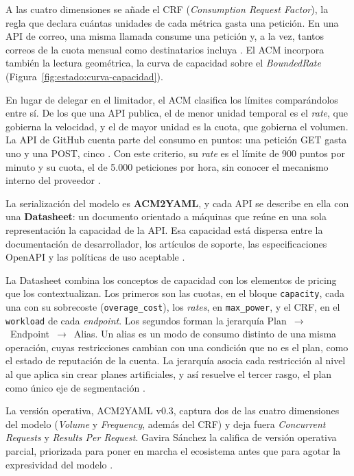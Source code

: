A las cuatro dimensiones se añade el CRF (\textit{Consumption Request Factor}),
la regla que declara cuántas unidades de cada métrica gasta una petición.
En una API de correo, una misma llamada consume una petición y, a la vez, tantos correos de la
cuota mensual como destinatarios incluya \citep{gavira2026tfm}. El ACM
incorpora también la lectura geométrica, la curva de capacidad sobre el
\textit{BoundedRate} (Figura~\ref{fig:estado:curva-capacidad}).

En lugar
de delegar en el limitador, el ACM clasifica los límites comparándolos
entre sí. De los que una API publica, el de menor unidad temporal es el
\textit{rate}, que gobierna la velocidad, y el de mayor unidad es la
cuota, que gobierna el volumen. La API de GitHub cuenta parte del consumo
en puntos: una petición GET gasta uno y una POST, cinco
\citep{githubratelimits}. Con este criterio, su \textit{rate} es el límite
de 900 puntos por minuto y su cuota, el de 5.000 peticiones por hora, sin
conocer el mecanismo interno del proveedor \citep{gavira2026tfm}.

La serialización del modelo es \textbf{ACM2YAML}, y cada API se describe
en ella con una \textbf{Datasheet}: un documento orientado a máquinas que
reúne en una sola representación la capacidad de la API. Esa capacidad
está dispersa entre la documentación de desarrollador, los artículos de
soporte, las especificaciones OpenAPI y las políticas de uso aceptable
\citep{gavira2026tfm}.

La Datasheet combina los conceptos de capacidad con los elementos de
pricing que los contextualizan. Los primeros son las cuotas, en el bloque
\texttt{capacity}, cada una con su sobrecoste (\texttt{overage\_cost}),
los \textit{rates}, en \texttt{max\_power}, y el CRF, en el
\texttt{workload} de cada \textit{endpoint}. Los segundos forman la jerarquía
Plan~$\rightarrow$~Endpoint~$\rightarrow$~Alias. Un alias es un modo de
consumo distinto de una misma operación, cuyas restricciones cambian con
una condición que no es el plan, como el estado de reputación de la
cuenta. La jerarquía asocia cada restricción al nivel al que aplica sin
crear planes artificiales, y así resuelve el tercer rasgo, el plan como
único eje de segmentación \citep{gavira2026tfm}.

La versión operativa, ACM2YAML v0.3, captura dos de las cuatro
dimensiones del modelo (\textit{Volume} y \textit{Frequency}, además del
CRF) y deja fuera \textit{Concurrent Requests} y \textit{Results Per
Request}. Gavira Sánchez la califica de
versión operativa parcial, priorizada para poner en marcha el ecosistema
antes que para agotar la expresividad del modelo
\citep{gavira2026tfm}.

